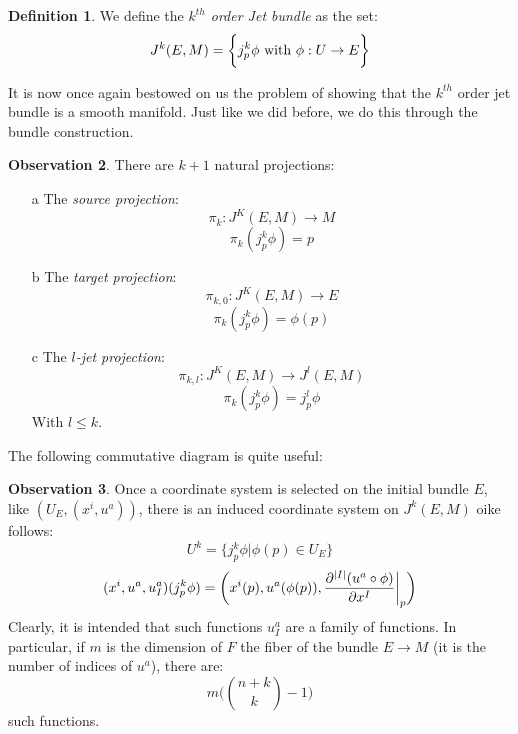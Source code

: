 \documentclass[12pt,a4paper]{report}
\theoremstyle{definition}
\newtheorem{Def}{Definition}[chapter]
\theoremstyle{Theorem}
\theoremstyle{definition}
\theoremstyle{definition}
\newtheorem{Obs}[Def]{Observation}
\begin{document}
	\begin{Def}
		We define the \textit{$k^{th}$ order Jet bundle} as the set:
		$$J^k(E,M)=\bigg\{j^k_p\phi \hbox{ with } \phi:U\rightarrow E\bigg\}$$
	\end{Def}
	It is now once again bestowed on us the problem of showing that the $k^{th}$ order jet bundle is a smooth manifold. Just like we did before, we do this through the bundle construction.
	\begin{Obs}
		There are $k+1$ natural projections:
		\begin{itemize}
			\item[a] The \textit{source projection}:
			$$\pi_{k}:J^K(E,M)\longrightarrow M$$
			$$\pi_k(j^k_p\phi)=p$$
			\item[b] The \textit{target projection}:
			$$\pi_{k,0}:J^K(E,M)\longrightarrow E$$
			$$\pi_k(j^k_p\phi)=\phi(p)$$
			\item[c] The \textit{$l$-jet projection}:
			$$\pi_{k,l}:J^K(E,M)\longrightarrow J^l(E,M)$$
			$$\pi_k(j^k_p\phi)=j^l_p\phi$$
			With $l\leq k$.
		\end{itemize}
		The following commutative diagram is quite useful:
		\begin{center}
		\end{center}
	\end{Obs}
	\begin{Obs}
		Once a coordinate system is selected on the initial bundle $E$, like $(U_E,(x^i,u^a))$, there is an induced coordinate system on $J^k(E,M)$ oike follows:
		$$U^k=\big\{j^k_p\phi\big|\phi(p)\in U_E\big\}$$
		$$(x^i,u^a,u^a_I)(j^k_p\phi)=\bigg(x^i(p),u^a(\phi(p)),{\partial^{|I|}(u^a\circ \phi)\over \partial x^I}\bigg|_p\bigg)$$
		Clearly, it is intended that such functions $u^a_I$ are a family of functions. In particular, if $m$ is the dimension of $F$ the fiber of the bundle $E\rightarrow M$ (it is the number of indices of $u^a$), there are:
		$$m\bigg({n+k\choose k}-1\bigg)$$
		such functions.
	\end{Obs}
\end{document}
